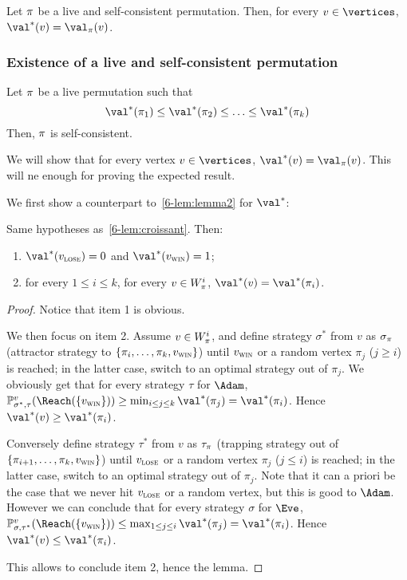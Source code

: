 \begin{corollary}
\label{6-cor:live_self-consistent_value}
Let $\pi$ be a live and self-consistent permutation. Then, for
every $v \in \vertices$, $\val^*(v) = \val_\perm(v)$.  
\end{corollary}

\subsubsection{Existence of a live and self-consistent permutation}

\begin{lemma}
\label{6-lem:live_non-dec_self-consistent}
Let $\pi$ be a live permutation such that
\[
\val^*(\perm_1) \le \val^*(\perm_2) \le \ldots \le \val^*(\perm_k)
\]
Then, $\pi$ is self-consistent.
\end{lemma}

We will show that for every vertex $v \in \vertices$, $\val^*(v) =
\val_\perm(v)$. This will ne enough for proving the expected result.

We first show a counterpart to~\cref{6-lem:lemma2} for
$\val^*$:
\begin{lemma}
  Same hypotheses as~\cref{6-lem:croissant}. Then:
  \begin{enumerate}
  \item $\val^*(\vlose) = 0$ and $\val^*(\vwin) = 1$;
  \item for every $1 \le i \le k$, for every $v \in W_\pi^i$,
    $\val^*(v) = \val^*(\perm_i)$.
  \end{enumerate}
\end{lemma}

\begin{proof}
  Notice that item 1 is obvious. 

  We then focus on item 2.  Assume $v \in W_\pi^i$, and define
  strategy $\sigma^*$ from $v$ as $\sigma_\pi$ (attractor strategy
  to $\{\pi_i,\ldots,\pi_k,v_{\textsc{win}}\}$) until $v_{\textsc{win}}$ or a random
  vertex $\pi_j$ ($j \ge i$) is reached; in the latter case, switch
  to an optimal strategy out of $\pi_j$. We obviously get that for
  every strategy $\tau$ for $\Adam$,
  $\probm_{\sigma^*,\tau}^v(\Reach(\{\vwin\})) \ge \min_{i \le j \le
    k}\val^*(\perm_j) = \val^*(\perm_i)$. Hence $\val^*(v) \ge
  \val^*(\perm_i)$.
  
  Conversely define strategy $\tau^*$ from $v$ as $\tau_\pi$
  (trapping strategy out of $\{\pi_{i+1},\ldots,\pi_k,v_{\textsc{win}}\}$)
  until $v_{\textsc{lose}}$ or a random vertex $\pi_j$ ($j \le i$) is reached;
  in the latter case, switch to an optimal strategy out of
  $\pi_j$. Note that it can a priori be the case that we never hit
  $v_{\textsc{lose}}$ or a random vertex, but this is good to $\Adam$. However we
  can conclude that for every strategy $\sigma$ for $\Eve$,
  $\probm_{\sigma,\tau^*}^v(\Reach(\{\vwin\})) \le \max_{1 \le j \le
    i}\val^*(\perm_j) = \val^*(\perm_i)$. Hence
  $\val^*(v) \le \val^*(\perm_i)$.

  This allows to conclude item 2, hence the lemma.
\end{proof}


